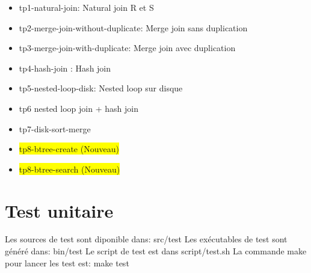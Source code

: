 \documentclass[a4paper]{article}
\begin{document}
\begin{itemize}
  \item tp1-natural-join: Natural join R et S
  \item tp2-merge-join-without-duplicate: Merge join sans duplication
  \item tp3-merge-join-with-duplicate: Merge join avec duplication
  \item tp4-hash-join : Hash join
  \item tp5-nested-loop-disk: Nested loop sur disque
  \item tp6 nested loop join + hash join
  \item tp7-disk-sort-merge
  \item \colorbox{yellow}{tp8-btree-create (Nouveau)}
  \item \colorbox{yellow}{tp8-btree-search (Nouveau)}
\end{itemize}

\section{Test unitaire}

Les sources de test sont diponible dans: src/test
Les exécutables de test sont généré dans: bin/test
Le script de test est dans script/test.sh
La commande make pour lancer les test est: make test
\end{document}
